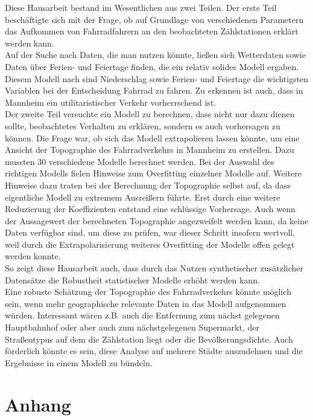 \documentclass[a4paper,12pt]{thesis}
\begin{document}
Diese Hausarbeit bestand im Wesentlichen aus zwei Teilen. Der erste Teil beschäftigte sich mit der Frage, ob auf Grundlage von verschiedenen Parametern das Aufkommen von Fahrradfahrern an den beobachteten Zählstationen erklärt werden kann.\\
Auf der Suche nach Daten, die man nutzen könnte, ließen sich Wetterdaten sowie Daten über Ferien- und Feiertage finden, die ein relativ solides Modell ergaben. Diesem Modell nach sind Niederschlag sowie Ferien- und Feiertage die wichtigsten Variablen bei der Entscheidung Fahrrad zu fahren. Zu erkennen ist auch, dass in Mannheim ein utilitaristischer Verkehr vorherrschend ist.\\
Der zweite Teil versuchte ein Modell zu berechnen, dass nicht nur dazu dienen sollte, beobachtetes Verhalten zu erklären, sondern es auch vorhersagen zu können. Die Frage war, ob sich das Modell extrapolieren lassen könnte, um eine Ansicht der Topographie des Fahrradverkehrs in Mannheim zu erstellen. Dazu mussten 30 verschiedene Modelle berechnet werden. Bei der Auswahl des richtigen Modells fielen Hinweise zum Overfitting einzelner Modelle auf. Weitere Hinweise dazu traten bei der Berechnung der Topographie selbst auf, da dass eigentliche Modell zu extremem Ausreißern führte. Erst durch eine weitere Reduzierung der Koeffizienten entstand eine schlüssige Vorhersage. Auch wenn der Aussagewert der berechneten Topographie angezweifelt werden kann, da keine Daten verfügbar sind, um diese zu prüfen, war dieser Schritt insofern wertvoll, weil durch die Extrapolarisierung weiteres Overfitting der Modelle offen gelegt werden konnte.\\
So zeigt diese Hausarbeit auch, dass durch das Nutzen synthetischer zusätzlicher Datensätze die Robustheit statistischer Modelle erhöht werden kann.\\
Eine robuste Schätzung der Topographie des Fahrradverkehrs könnte möglich sein, wenn mehr geographische relevante Daten in das Modell aufgenommen würden. Interessant wären z.B. auch die Entfernung zum nächst gelegenen Hauptbahnhof oder aber auch zum nächstgelegenen Supermarkt, der Straßentypus auf dem die Zählstation liegt oder die Bevölkerungsdichte. Auch förderlich könnte es sein, diese Analyse auf mehrere Städte auszudehnen und die Ergebnisse in einem Modell zu bündeln.





\chapter{Anhang}
\end{document}
